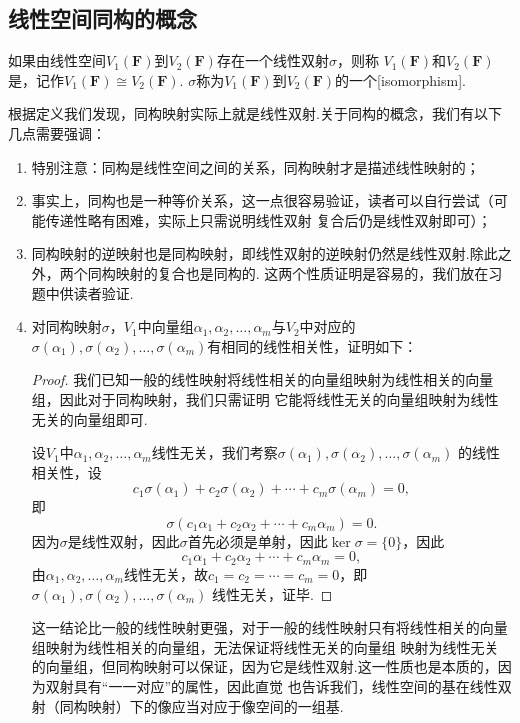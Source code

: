 \subsection{线性空间同构的概念}
\begin{definition}
    如果由线性空间$V_1(\mathbf{F})$到$V_2(\mathbf{F})$存在一个线性双射$\sigma$，则称
    $V_1(\mathbf{F})$和$V_2(\mathbf{F})$是，记作$V_1(\mathbf{F}) \cong V_2(\mathbf{F})$.
    $\sigma$称为$V_1(\mathbf{F})$到$V_2(\mathbf{F})$的一个[isomorphism].
\end{definition}

根据定义我们发现，同构映射实际上就是线性双射.关于同构的概念，我们有以下几点需要强调：
\begin{enumerate}
    \item 特别注意：同构是线性空间之间的关系，同构映射才是描述线性映射的；
    \item 事实上，同构也是一种等价关系，这一点很容易验证，读者可以自行尝试（可能传递性略有困难，实际上只需说明线性双射
    复合后仍是线性双射即可）；
    \item 同构映射的逆映射也是同构映射，即线性双射的逆映射仍然是线性双射.除此之外，两个同构映射的复合也是同构的.
    这两个性质证明是容易的，我们放在习题中供读者验证.
    \item 对同构映射$\sigma$，$V_1$中向量组$ \alpha_1,\alpha_2,\ldots,\alpha_m $与$V_2$中对应的
    $ \sigma(\alpha_1),\sigma(\alpha_2),\ldots,\sigma(\alpha_m) $有相同的线性相关性，证明如下：

    \begin{proof}
        我们已知一般的线性映射将线性相关的向量组映射为线性相关的向量组，因此对于同构映射，我们只需证明
        它能将线性无关的向量组映射为线性无关的向量组即可.
        
        设$V_1$中$\alpha_1,\alpha_2,\ldots,\alpha_m$线性无关，我们考察$\sigma(\alpha_1),\sigma(\alpha_2),\ldots,\sigma(\alpha_m)$
        的线性相关性，设
        \[c_1\sigma(\alpha_1)+c_2\sigma(\alpha_2)+\cdots+c_m\sigma(\alpha_m)=0,\]
        即
        \[\sigma(c_1\alpha_1+c_2\alpha_2+\cdots+c_m\alpha_m)=0.\]
        因为$\sigma$是线性双射，因此$\sigma$首先必须是单射，因此$\ker\sigma=\{0\}$，因此
        \[c_1\alpha_1+c_2\alpha_2+\cdots+c_m\alpha_m=0,\]
        由$\alpha_1,\alpha_2,\ldots,\alpha_m$线性无关，故$c_1=c_2=\cdots=c_m=0$，即$\sigma(\alpha_1),\sigma(\alpha_2),\ldots,\sigma(\alpha_m)$
        线性无关，证毕.
    \end{proof}
    
    这一结论比一般的线性映射更强，对于一般的线性映射只有将线性相关的向量组映射为线性相关的向量组，无法保证将线性无关的向量组
    映射为线性无关的向量组，但同构映射可以保证，因为它是线性双射.这一性质也是本质的，因为双射具有``一一对应''的属性，因此直觉
    也告诉我们，线性空间的基在线性双射（同构映射）下的像应当对应于像空间的一组基.


\end{enumerate}
